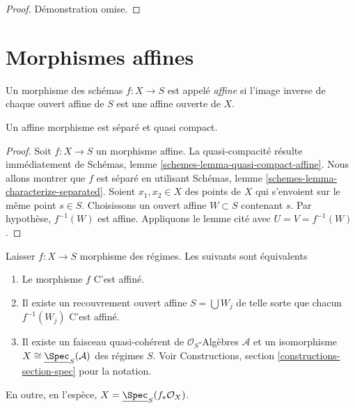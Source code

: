 \begin{proof}
Démonstration omise.
\end{proof}









\section{Morphismes affines}
\label{section-affine}

\begin{definition}

\label{definition-affine}
Un morphisme des schémas $f : X \to S$ est appelé {\it affine} si l'image inverse de chaque ouvert affine de $S$ est une affine ouverte de $X$.
\end{definition}

\begin{lemma}

\label{lemma-affine-separated}
Un affine morphisme est séparé et quasi compact.
\end{lemma}

\begin{proof}
Soit $f : X \to S$ un morphisme affine. La quasi-compacité résulte immédiatement de Schémas, lemme \ref{schemes-lemma-quasi-compact-affine}. Nous allons montrer que $f$ est séparé en utilisant Schémas, lemme \ref{schemes-lemma-characterize-separated}. Soient $x_1, x_2 \in X$ des points de $X$ qui s'envoient sur le même point $s \in S$. Choisissons un ouvert affine $W \subset S$ contenant $s$. Par hypothèse, $f^{-1}(W)$ est affine. Appliquons le lemme cité avec $U = V = f^{-1}(W)$.
\end{proof}

\begin{lemma}

\label{lemma-characterize-affine}

\begin{reference}

\cite[II, corollaire 1.3.2]{EGA}

\end{reference}

Laisser $f : X \to S$ morphisme des régimes. Les suivants sont équivalents

\begin{enumerate}

\item Le morphisme $f$ C'est affiné.
\item Il existe un recouvrement ouvert affine $S = \bigcup W_j$
de telle sorte que chacun $f^{-1}(W_j)$ C'est affiné.
\item Il existe un faisceau quasi-cohérent de $\mathcal{O}_S$-Algèbres
$\mathcal{A}$ et un isomorphisme
$X \cong \underline{\Spec}_S(\mathcal{A})$
des régimes $S$. Voir Constructions, section \ref{constructions-section-spec} pour la notation.

\end{enumerate}

En outre, en l'espèce, $X = \underline{\Spec}_S(f_*\mathcal{O}_X)$.

\end{lemma}

